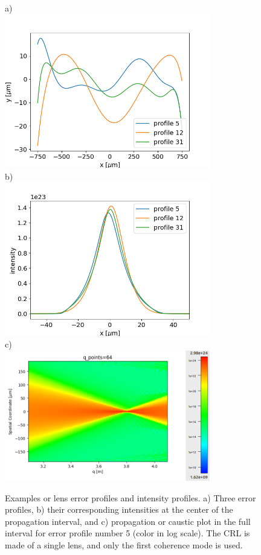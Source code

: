 \documentclass{iucr}
\begin{document}
\begin{figure}\label{fig:sample}
    a)~~~~~~~~~~~~~~~~~~~~~~~~~~~~~~~~~~~~~~~~\\ \includegraphics[width=0.8\textwidth]{figures/Figure2a.png}
    b)~~~~~~~~~~~~~~~~~~~~~~~~~~~~~~~~~~~~~~~~\\ \includegraphics[width=0.8\textwidth]{figures/Figure2b.png}
    c)~~~~~~~~~~~~~~~~~~~~~~~~~~~~~~~~~~~~~~~~\\\includegraphics[width=0.8\textwidth]{figures/Figure2c.png}
    
    \caption{Examples or lens error profiles and intensity profiles. a) Three error profiles, b) their corresponding intensities at the center of the propagation interval, and c) propagation or caustic plot in the full interval for error profile number 5 (color in log scale). The CRL is made of a single lens, and only the first coherence mode is used.
    }
\end{figure}
\end{document}
